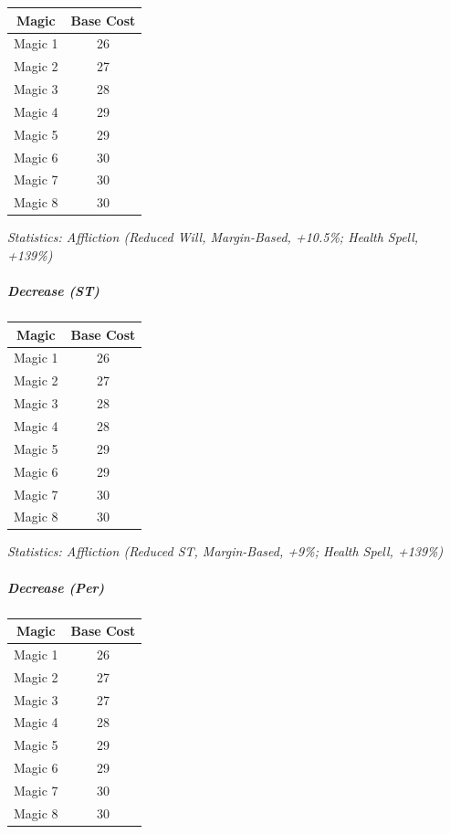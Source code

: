 \begin{multicols*}{3}
		\begin{center}
		\begin{tabular}{|c|c|}
			\hline
			Magic & Base Cost \\
			\hline
			\hline
			Magic 1 & 26 \\
			Magic 2 & 27 \\
			Magic 3 & 28 \\
			Magic 4 & 29 \\
			Magic 5 & 29 \\
			Magic 6 & 30 \\
			Magic 7 & 30 \\
			Magic 8 & 30 \\
			\hline
		\end{tabular}
	\end{center}	
	
	\textcolor{OliveGreen}{\textit{Statistics: Affliction (Reduced Will, Margin-Based, +10.5\%; Health Spell, +139\%) }}
		
	\subparagraph{Decrease (ST)}
	
	\begin{center}
		\begin{tabular}{|c|c|}
			\hline
			Magic & Base Cost \\
			\hline
			\hline
			Magic 1 & 26 \\
			Magic 2 & 27 \\
			Magic 3 & 28 \\
			Magic 4 & 28 \\
			Magic 5 & 29 \\
			Magic 6 & 29 \\
			Magic 7 & 30 \\
			Magic 8 & 30 \\
			\hline
		\end{tabular}
	\end{center}	
	
	\textcolor{OliveGreen}{\textit{Statistics: Affliction (Reduced ST, Margin-Based, +9\%; Health Spell, +139\%) }}	
	
	\subparagraph{Decrease (Per)}
	
	\begin{center}
		\begin{tabular}{|c|c|}
			\hline
			Magic & Base Cost \\
			\hline
			\hline
			Magic 1 & 26 \\
			Magic 2 & 27 \\
			Magic 3 & 27 \\
			Magic 4 & 28 \\
			Magic 5 & 29 \\
			Magic 6 & 29 \\
			Magic 7 & 30 \\
			Magic 8 & 30 \\
			\hline
		\end{tabular}
	\end{center}	
	

\end{multicols*}
